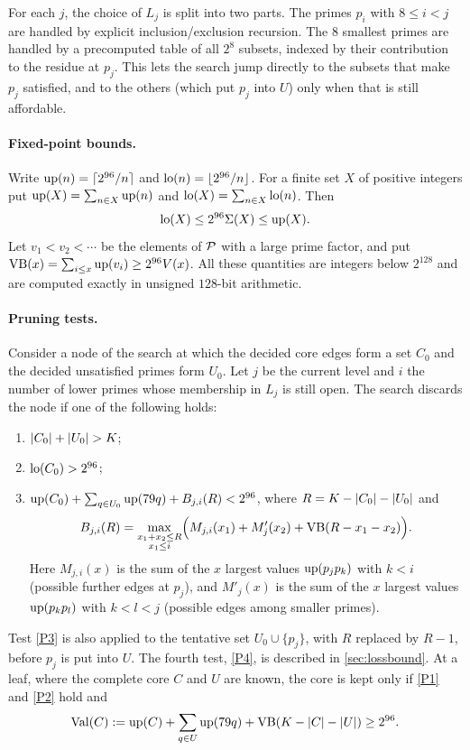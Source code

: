 \documentclass[11pt]{article}
\begin{document}
For each $j$, the choice of $L_j$ is split into two parts. The primes $p_i$ with $8\le i<j$ are handled by explicit inclusion/exclusion recursion. The $8$ smallest primes are handled by a precomputed table of all $2^8$ subsets, indexed by their contribution to the residue at $p_j$. This lets the search jump directly to the subsets that make $p_j$ satisfied, and to the others (which put $p_j$ into $U$) only when that is still affordable.

\paragraph{Fixed-point bounds.}
Write $\operatorname{up}(n)=\lceil 2^{96}/n\rceil$ and $\operatorname{lo}(n)=\lfloor 2^{96}/n\rfloor$. For a finite set $X$ of positive integers put $\operatorname{up}(X)=\sum_{n\in X}\operatorname{up}(n)$ and $\operatorname{lo}(X)=\sum_{n\in X}\operatorname{lo}(n)$. Then
\[
\operatorname{lo}(X)\le 2^{96}\Sigma(X)\le\operatorname{up}(X).
\]
Let $v_1<v_2<\cdots$ be the elements of $\mathcal{P}$ with a large prime factor, and put $\mathrm{VB}(x)=\sum_{i\le x}\operatorname{up}(v_i)\ge2^{96}V(x)$.
All these quantities are integers below $2^{128}$ and are computed exactly in unsigned $128$-bit arithmetic.

\paragraph{Pruning tests.}
Consider a node of the search at which the decided core edges form a set $C_0$ and the decided unsatisfied primes form $U_0$. Let $j$ be the current level and $i$ the number of lower primes whose membership in $L_j$ is still open. The search discards the node if one of the following holds:
\begin{enumerate}[label=\textup{(P\arabic*)}]
\item\label{P1} $\lvert C_0\rvert+\lvert U_0\rvert>K$;
\item\label{P2} $\operatorname{lo}(C_0)>2^{96}$;
\item\label{P3} $\operatorname{up}(C_0)+\sum_{q\in U_0}\operatorname{up}(79q)+B_{j,i}(R)<2^{96}$, where $R=K-\lvert C_0\rvert-\lvert U_0\rvert$ and
\[
B_{j,i}(R)=\max_{\substack{x_1+x_2\le R\\ x_1\le i}}\Bigl(M_{j,i}(x_1)+M'_j(x_2)+\mathrm{VB}(R-x_1-x_2)\Bigr).
\]
Here $M_{j,i}(x)$ is the sum of the $x$ largest values $\operatorname{up}(p_jp_k)$ with $k<i$ (possible further edges at $p_j$), and $M'_j(x)$ is the sum of the $x$ largest values $\operatorname{up}(p_kp_l)$ with $k<l<j$ (possible edges among smaller primes).
\end{enumerate}
Test \ref{P3} is also applied to the tentative set $U_0\cup\{p_j\}$, with $R$ replaced by $R-1$, before $p_j$ is put into $U$.
The fourth test, \ref{P4}, is described in \cref{sec:lossbound}.
At a leaf, where the complete core $C$ and $U$ are known, the core is kept only if \ref{P1} and \ref{P2} hold and
\begin{equation}\label{eq:leaftest}
\mathrm{Val}(C):=\operatorname{up}(C)+\sum_{q\in U}\operatorname{up}(79q)+\mathrm{VB}(K-\lvert C\rvert-\lvert U\rvert)\ge2^{96}.
\end{equation}
\end{document}
